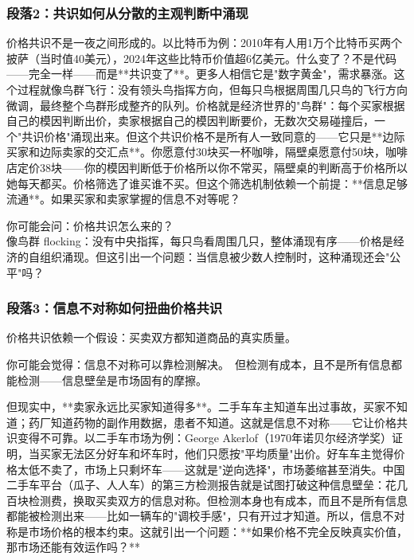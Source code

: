 \documentclass[openany, a4paper, 12pt]{book}
\begin{document}
	\subsubsection*{段落2：共识如何从分散的主观判断中涌现}
	价格共识不是一夜之间形成的。以比特币为例：2010年有人用1万个比特币买两个披萨（当时值40美元），2024年这些比特币价值超6亿美元。什么变了？不是代码——完全一样——而是**共识变了**。更多人相信它是"数字黄金"，需求暴涨。这个过程就像鸟群飞行：没有领头鸟指挥方向，但每只鸟根据周围几只鸟的飞行方向微调，最终整个鸟群形成整齐的队列。价格就是经济世界的"鸟群"：每个买家根据自己的模因判断出价，卖家根据自己的模因判断要价，无数次交易碰撞后，一个"共识价格"涌现出来。但这个共识价格不是所有人一致同意的——它只是**边际买家和边际卖家的交汇点**。你愿意付30块买一杯咖啡，隔壁桌愿意付50块，咖啡店定价38块——你的模因判断低于价格所以你不常买，隔壁桌的判断高于价格所以她每天都买。价格筛选了谁买谁不买。但这个筛选机制依赖一个前提：**信息足够流通**。如果买家和卖家掌握的信息不对等呢？

	\begin{tcolorbox}[colback=yellow!5, title=\textit{读者行为预测}]
		你可能会问：价格共识怎么来的？\\ 像鸟群 flocking：没有中央指挥，每只鸟看周围几只，整体涌现有序——价格是经济的自组织涌现。但这引出一个问题：当信息被少数人控制时，这种涌现还会"公平"吗？
	\end{tcolorbox}

	\subsubsection*{段落3：信息不对称如何扭曲价格共识}
	价格共识依赖一个假设：买卖双方都知道商品的真实质量。
	\begin{tcolorbox}[colback=yellow!5, title=\textit{读者行为预测}]
		你可能会觉得：信息不对称可以靠检测解决。\ 但检测有成本，且不是所有信息都能检测——信息壁垒是市场固有的摩擦。
	\end{tcolorbox}

但现实中，**卖家永远比买家知道得多**。二手车车主知道车出过事故，买家不知道；药厂知道药物的副作用数据，患者不知道。这就是信息不对称——它让价格共识变得不可靠。以二手车市场为例：George Akerlof（1970年诺贝尔经济学奖）证明，当买家无法区分好车和坏车时，他们只愿按"平均质量"出价。好车车主觉得价格太低不卖了，市场上只剩坏车——这就是"逆向选择"，市场萎缩甚至消失。中国二手车平台（瓜子、人人车）的第三方检测报告就是试图打破这种信息壁垒：花几百块检测费，换取买卖双方的信息对称。但检测本身也有成本，而且不是所有信息都能被检测出来——比如一辆车的"调校手感"，只有开过才知道。所以，信息不对称是市场价格的根本约束。这就引出一个问题：**如果价格不完全反映真实价值，那市场还能有效运作吗？**
\end{document}
